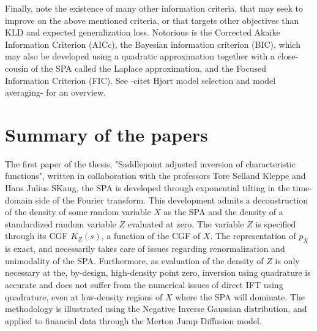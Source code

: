 Finally, note the existence of many other information criteria, that may seek to improve on the above mentioned criteria, or that targets other objectives than KLD and expected generalization loss. Notorious is the Corrected Akaike Information Criterion (AICc), the Bayesian information criterion (BIC), which may also be developed using a quadratic approximation together with a close-cousin of the SPA called the Laplace approximation, and the Focused Information Criterion (FIC).
See -citet Hjort model selection and model averaging- for an overview.


\chapter{Summary of the papers}

The first paper of the thesis, "Saddlepoint adjusted inversion of characteristic functions", written in collaboration with the professors Tore Selland Kleppe and Hans Julius SKaug, the SPA is developed through exponential tilting in the time-domain side of the Fourier transform. 
This development admits a deconstruction of the density of some random variable $X$ as the SPA and the density of a standardized random variable $Z$ evaluated at zero. The variable $Z$ is specified through its CGF $K_Z(s)$, a function of the CGF of $X$.
The representation of $p_X$ is exact, and necessarily takes care of issues regarding renormalization and unimodality of the SPA.
Furthermore, as evaluation of the density of $Z$ is only necessary at the, by-design, high-density point zero, inversion using quadrature is accurate and does not suffer from the numerical issues of direct IFT using quadrature, even at low-density regions of $X$ where the SPA will dominate.
The methodology is illustrated using the Negative Inverse Gaussian distribution, and applied to financial data through the Merton Jump Diffusion model.


